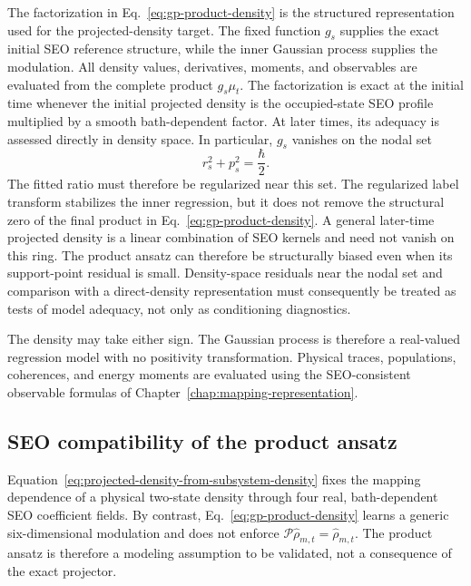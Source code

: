 \documentclass[
  11pt,
  letterpaper,
  onehalfspacing,
  normalmargins,
  equalmargins,
  oneside
]{ut-thesis}
\begin{document}
The factorization in Eq.~\eqref{eq:gp-product-density} is the structured
representation used for the projected-density target. The fixed function
\(g_s\) supplies the exact initial SEO reference structure, while
the inner Gaussian process supplies the modulation. All density values,
derivatives, moments, and observables are evaluated from the complete product
\(g_s\mu_t\). The factorization is exact at the initial time whenever the
initial projected density is the occupied-state SEO profile multiplied by a
smooth bath-dependent factor. At later times, its adequacy is assessed
directly in density space. In particular,
\(g_s\) vanishes on the nodal set
\begin{equation}
 r_s^2+p_s^2=\frac{\hbar}{2}.
\label{eq:occupied-seo-nodal-ring}
\end{equation}
The fitted ratio must therefore be regularized near this set. The regularized
label transform stabilizes the inner regression, but it does not remove the
structural zero of the final product in
Eq.~\eqref{eq:gp-product-density}. A general later-time projected density is a
linear combination of SEO kernels and need not vanish on this ring. The
product ansatz can therefore be structurally biased even when its support-point
residual is small. Density-space residuals near the nodal set and comparison
with a direct-density representation must consequently be treated as tests
of model adequacy, not only as conditioning diagnostics.

The density may take either sign. The Gaussian process is therefore a
real-valued regression model with no positivity transformation. Physical
traces, populations, coherences, and energy moments are evaluated using the
SEO-consistent observable formulas of
Chapter~\ref{chap:mapping-representation}.

\subsection{SEO compatibility of the product ansatz}
\label{subsec:gp-seo-compatibility}

Equation~\eqref{eq:projected-density-from-subsystem-density} fixes the mapping
dependence of a physical two-state density through four real,
bath-dependent SEO coefficient fields. By contrast,
Eq.~\eqref{eq:gp-product-density} learns a generic six-dimensional modulation
and does not enforce
\(\mathcal P\widehat\rho_{m,t}=\widehat\rho_{m,t}\).
The product ansatz is therefore a modeling assumption to be validated, not a
consequence of the exact projector.
\end{document}
